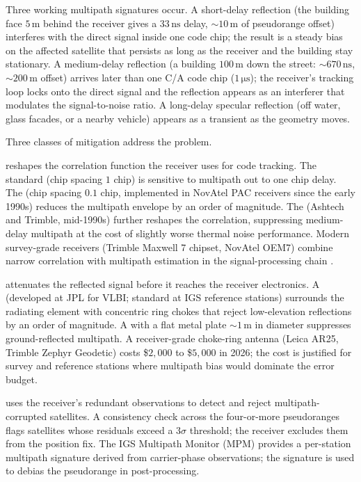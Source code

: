 Three working multipath signatures occur. A short-delay reflection
(the building face $5 \,\si{\meter}$ behind the receiver gives a
$33 \,\si{\nano\second}$ delay, $\sim 10 \,\si{\meter}$ of
pseudorange offset) interferes with the direct signal inside one
code chip; the result is a steady bias on the affected satellite
that persists as long as the receiver and the building stay
stationary. A medium-delay reflection (a building $100 \,\si
{\meter}$ down the street: $\sim 670 \,\si{\nano\second}$,
$\sim 200 \,\si{\meter}$ offset) arrives later than one C/A code
chip ($1 \,\si{\micro\second}$); the receiver's tracking loop
locks onto the direct signal and the reflection appears as an
interferer that modulates the signal-to-noise ratio. A
long-delay specular reflection (off water, glass facades, or a
nearby vehicle) appears as a transient as the geometry moves.

Three classes of mitigation address the problem.

 reshapes the correlation
function the receiver uses for code tracking. The standard
 (chip spacing $1$ chip) is sensitive to
multipath out to one chip delay. The 
(chip spacing $0.1$ chip, implemented in NovAtel PAC receivers
since the early 1990s) reduces the multipath envelope by an
order of magnitude. The  (Ashtech and
Trimble, mid-1990s) further reshapes the correlation, suppressing
medium-delay multipath at the cost of slightly worse thermal noise
performance. Modern survey-grade receivers (Trimble Maxwell 7
chipset, NovAtel OEM7) combine narrow correlation with multipath
estimation in the signal-processing chain
\cite{text:ch06t3-kaplan-hegarty-2017}.

 attenuates the reflected signal
before it reaches the receiver electronics. A  (developed at JPL for VLBI; standard at IGS reference
stations) surrounds the radiating element with concentric ring
chokes that reject low-elevation reflections by an order of
magnitude. A  with a flat metal
plate $\sim 1 \,\si{\meter}$ in diameter suppresses
ground-reflected multipath. A receiver-grade choke-ring antenna
(Leica AR25, Trimble Zephyr Geodetic) costs \$$2{,}000$ to \$$5{,}
000$ in 2026; the cost is justified for survey and reference
stations where multipath bias would dominate the error budget.

 uses the receiver's redundant
observations to detect and reject multipath-corrupted satellites.
A consistency check across the four-or-more pseudoranges flags
satellites whose residuals exceed a $3\sigma$ threshold; the
receiver excludes them from the position fix. The IGS Multipath
Monitor (MPM) provides a per-station multipath signature derived
from carrier-phase observations; the signature is used to debias
the pseudorange in post-processing.


